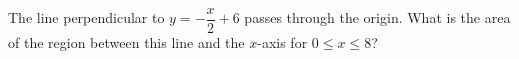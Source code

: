 The line perpendicular to \(y=-\dfrac{x}{2}+6\) passes through the origin. What is the area of the region between this line and the \(x\)-axis for \(0\le x\le8\)?

